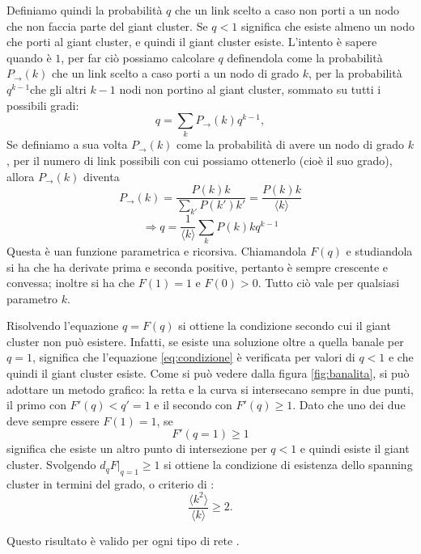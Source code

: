 Definiamo quindi la probabilit\`a $q$ che un link scelto a caso non porti a un nodo che non faccia parte del giant cluster. Se $q<1$ significa che esiste almeno un nodo che porti al giant cluster, e quindi il giant cluster esiste. L'intento \`e sapere quando \`e $1$, per far ci\`o possiamo calcolare $q$ definendola come la probabilit\`a $P_{\rightarrow}(k)$ che un link scelto a caso porti a un nodo di grado $k$, per la probabilit\`a $q^{k-1}$che gli altri $k-1$ nodi non portino al giant cluster, sommato su tutti i possibili gradi:
\begin{equation}
\label{eq:condizione}
	q = \sum_k P_{\rightarrow}(k) q^{k-1},
\end{equation}
Se definiamo a sua volta $P_{\rightarrow}(k)$ come la probabilit\`a di avere un nodo di grado $k$, per il numero di link possibili con cui possiamo ottenerlo (cio\`e il suo grado), allora $P_{\rightarrow}(k)$ diventa
\[P_{\rightarrow}(k) = \frac{P(k)k}{\sum_{k'}P(k')k'} = \frac{P(k)k}{\langle k \rangle}\]
\[\Rightarrow q = \frac{1}{\langle k \rangle}\sum_k P(k)kq^{k-1} \]
Questa \`e uan funzione parametrica e ricorsiva. Chiamandola $F(q)$ e studiandola si ha che ha derivate prima e seconda positive, pertanto \`e sempre crescente e convessa; inoltre si ha che $F(1) = 1$ e $F(0)>0$. Tutto ci\`o vale per qualsiasi parametro $k$. 

Risolvendo l'equazione $q = F(q)$ si ottiene la condizione secondo cui il giant cluster non pu\`o esistere. Infatti, se esiste una soluzione oltre a quella banale per $q=1$, significa che l'equazione \ref{eq:condizione} \`e verificata per valori di $q<1$ e che quindi il giant cluster esiste. Come si pu\`o vedere dalla figura \ref{fig:banalita}, si pu\`o adottare un metodo grafico: la retta e la curva si intersecano sempre in due punti, il primo con $F'(q)<q'=1$ e il secondo con $F'(q) \geq 1$. Dato che uno dei due deve sempre essere $F(1)=1$, se 
\begin{equation}
\label{eq:soluzione}
F'(q=1) \geq 1 
\end{equation}
significa che esiste un altro punto di intersezione per $q<1$ e quindi esiste il giant cluster.
Svolgendo $d_qF|_{q=1} \geq 1$ si ottiene la condizione di esistenza dello spanning cluster in termini del grado, o criterio di \textcite{Molloy1995}:
\begin{equation}
 \label{eq:criterion}
 \frac{\langle k^2\rangle}{\langle k \rangle}\geq 2.
\end{equation}

Questo risultato \`e valido per ogni tipo di rete \parencite{Cohen2000}.

